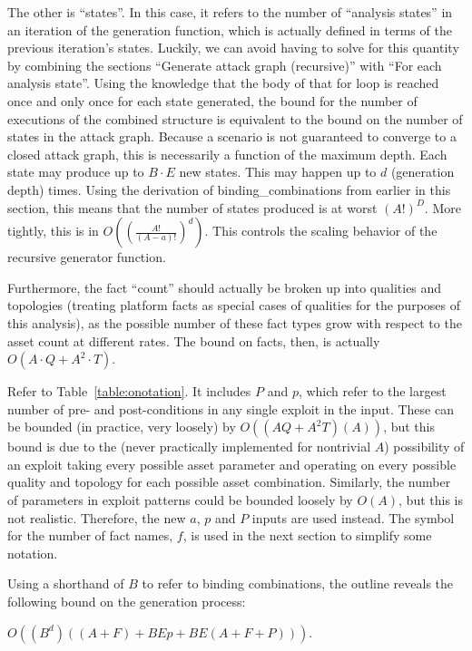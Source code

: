 The other is ``states''. In this case, it refers to the number of ``analysis states''
in an iteration of the generation function, which is actually defined in terms
of the previous iteration's states. Luckily, we can avoid having to solve for
this quantity by combining the sections ``Generate attack graph (recursive)''
with ``For each analysis state''. Using the knowledge that the body of that for
loop is reached once and only once for each state generated, the bound for the
number of executions of the combined structure is equivalent to the bound on
the number of states in the attack graph. Because a scenario is not guaranteed
to converge to a closed attack graph, this is necessarily a function of the
maximum depth. Each state may produce up to $B \cdot
E$ new states. This may happen up to $d$ (generation depth) times. Using the
derivation of binding\_combinations from earlier in this section, this means 
that the number of states produced is at worst $(A!)^{D}$.
More tightly, this is in 
$O\left(\left(\frac{A!}{(A-a)!}\right)^{d}\right)$.
This controls the scaling behavior of the recursive generator function.

Furthermore, the fact ``count'' should actually be broken up into qualities and
topologies (treating platform facts as special cases of qualities for the
purposes of this analysis), as the possible number of these fact types grow 
with respect to the asset count at different rates. The bound on facts, then,
is actually $O(A \cdot Q + A^2 \cdot T)$.

Refer to Table~\ref{table:onotation}. It
includes $P$ and $p$, which refer to the largest number of pre- and 
post-conditions in any single exploit in the input. These can be bounded (in
practice, very loosely) by $O((AQ + A^2T)(A))$, but this bound is due to the
(never practically implemented for nontrivial $A$) possibility of an exploit
taking every possible asset parameter and operating on every possible quality
and topology for each possible asset combination. Similarly, the number of
parameters in exploit patterns could be bounded loosely by $O(A)$, but this is
not realistic. Therefore, the new $a$, $p$ and $P$ inputs are used instead.
The symbol for the number of fact names, $f$, is used in the next
section to simplify some notation.



Using a shorthand of $B$ to refer to binding combinations, the outline
reveals the following bound on the generation process:

$O((B^d)((A+F) + BEp + BE(A+F+P)))$.

